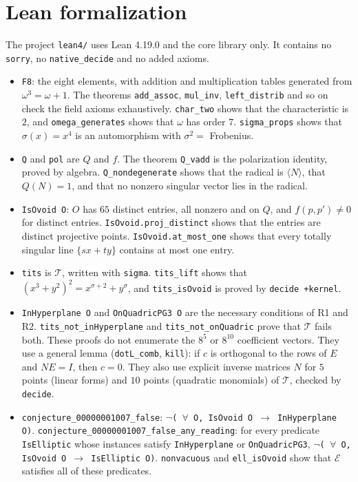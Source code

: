 \documentclass[11pt]{article}
\theoremstyle{definition}
\theoremstyle{remark}
\newcommand{\pol}{f}
\begin{document}
\section{Lean formalization}
The project \texttt{lean4/} uses Lean 4.19.0 and the core library only. It
contains no \texttt{sorry}, no \texttt{native\_decide} and no added axioms.
\begin{itemize}
\item \texttt{F8}: the eight elements, with addition and multiplication tables
generated from $\omega^3=\omega+1$. The theorems \texttt{add\_assoc},
\texttt{mul\_inv}, \texttt{left\_distrib} and so on check the field axioms
exhaustively. \texttt{char\_two} shows that the characteristic is $2$, and
\texttt{omega\_generates} shows that $\omega$ has order $7$.
\texttt{sigma\_props} shows that $\sigma(x)=x^4$ is an automorphism with
$\sigma^2=$ Frobenius.
\item \texttt{Q} and \texttt{pol} are $Q$ and $\pol$. The theorem
\texttt{Q\_vadd} is the polarization identity, proved by algebra.
\texttt{Q\_nondegenerate} shows that the radical is
$\langle N\rangle$, that $Q(N)=1$, and that no nonzero singular vector lies in
the radical.
\item \texttt{IsOvoid O}: $O$ has $65$ distinct entries, all nonzero and on $Q$,
and $\pol(p,p')\ne0$ for distinct entries. \texttt{IsOvoid.proj\_distinct}
shows that the entries are distinct projective points.
\texttt{IsOvoid.at\_most\_one} shows that every totally singular line
$\{sx+ty\}$ contains at most one entry.
\item \texttt{tits} is $\mathcal{T}$, written with \texttt{sigma}.
\texttt{tits\_lift} shows that $(x^3+y^2)^2=x^{\sigma+2}+y^\sigma$, and
\texttt{tits\_isOvoid} is proved by \texttt{decide +kernel}.
\item \texttt{InHyperplane O} and \texttt{OnQuadricPG3 O} are the necessary
conditions of R1 and R2. \texttt{tits\_not\_inHyperplane} and
\texttt{tits\_not\_onQuadric} prove that $\mathcal{T}$ fails both. These proofs
do not enumerate the $8^5$ or $8^{10}$ coefficient vectors. They use a general
lemma (\texttt{dotL\_comb}, \texttt{kill}): if $c$ is orthogonal to the rows of
$E$ and $NE=I$, then $c=0$. They also use explicit inverse matrices $N$ for $5$
points (linear forms) and $10$ points (quadratic monomials) of $\mathcal{T}$,
checked by \texttt{decide}.
\item \texttt{conjecture\_00000001007\_false}:
\texttt{$\neg$(\,$\forall$ O, IsOvoid O $\to$ InHyperplane O)}.
\texttt{conjecture\_00000001007\_false\_any\_reading}: for every predicate
\texttt{IsElliptic} whose instances satisfy \texttt{InHyperplane} or
\texttt{OnQuadricPG3}, \texttt{$\neg$(\,$\forall$ O, IsOvoid O $\to$ IsElliptic O)}.
\texttt{nonvacuous} and \texttt{ell\_isOvoid} show that $\mathcal{E}$ satisfies
all of these predicates.
\end{itemize}
\end{document}
